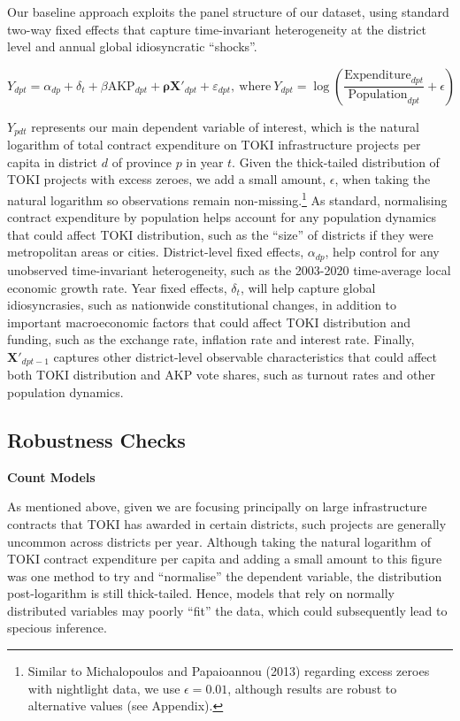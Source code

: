 \documentclass[10pt, oneside]{article}   	%
\numberwithin{equation}{section}
\begin{document}
Our baseline approach exploits the panel structure of our dataset, using standard two-way fixed effects that capture time-invariant heterogeneity at the district level and annual global idiosyncratic ``shocks''. 

\begin{equation}
Y_{dpt} = \alpha_{dp}+\delta_t+\beta\text{AKP}_{dpt} + \mathbf{\rho}\mathbf{X}'_{dpt}+\varepsilon_{dpt}, \ \text{where} \ Y_{dpt}=\log \left (\frac{\text{Expenditure}_{dpt}}{\text{Population}_{dpt}} + \epsilon \right)
\end{equation}

$Y_{pdt}$ represents our main dependent variable of interest, which is the natural logarithm of total contract expenditure on TOKI infrastructure projects per capita in district $d$ of province $p$ in year $t$. Given the thick-tailed distribution of TOKI projects with excess zeroes, we add a small amount, $\epsilon$, when taking the natural logarithm so observations remain non-missing.\footnote{Similar to Michalopoulos and Papaioannou (2013) regarding excess zeroes with nightlight data, we use $\epsilon=0.01$, although results are robust to alternative values (see Appendix).} As standard, normalising contract expenditure by population helps account for any population dynamics that could affect TOKI distribution, such as the ``size'' of districts if they were metropolitan areas or cities. District-level fixed effects, $\alpha_{dp}$, help control for any unobserved time-invariant heterogeneity, such as the 2003-2020 time-average local economic growth rate. Year fixed effects, $\delta_t$, will help capture global idiosyncrasies, such as nationwide constitutional changes, in addition to important macroeconomic factors that could affect TOKI distribution and funding, such as the exchange rate, inflation rate and interest rate. Finally, $\mathbf{X}'_{dpt-1}$ captures other district-level observable characteristics that could affect both TOKI distribution and AKP vote shares, such as turnout rates and other population dynamics. 

\subsection{Robustness Checks}

\textbf{Count Models}

As mentioned above, given we are focusing principally on large infrastructure contracts that TOKI has awarded in certain districts, such projects are generally uncommon across districts per year. Although taking the natural logarithm of TOKI contract expenditure per capita and adding a small amount to this figure was one method to try and ``normalise'' the dependent variable, the distribution post-logarithm is still thick-tailed. Hence, models that rely on normally distributed variables may poorly ``fit'' the data, which could subsequently lead to specious inference. 
\end{document}
